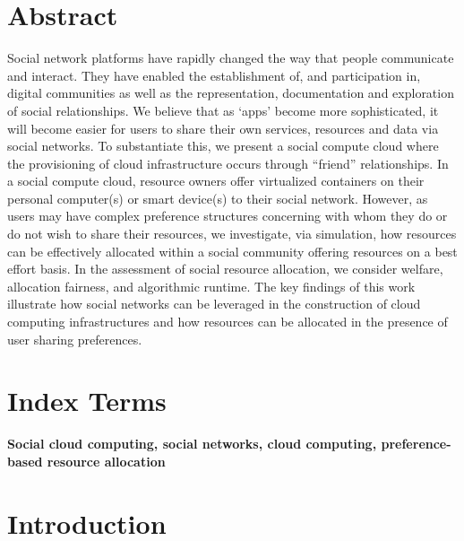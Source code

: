 \documentclass[a4paper,12pt]{article}
\begin{document}
    \newpage
    \tableofcontents
\newpage
    \listoffigures
    \newpage
    \section{Abstract}
	Social network platforms have rapidly changed the way that people communicate and interact. They have enabled the
	establishment of, and participation in, digital communities as well as the representation, documentation and exploration of social
	relationships. We believe that as ‘apps’ become more sophisticated, it will become easier for users to share their own services,
	resources and data via social networks. To substantiate this, we present a social compute cloud where the provisioning of cloud
	infrastructure occurs through “friend” relationships. In a social compute cloud, resource owners offer virtualized containers on their
	personal computer(s) or smart device(s) to their social network. However, as users may have complex preference structures
	concerning with whom they do or do not wish to share their resources, we investigate, via simulation, how resources can be effectively
	allocated within a social community offering resources on a best effort basis. In the assessment of social resource allocation, we
	consider welfare, allocation fairness, and algorithmic runtime. The key findings of this work illustrate how social networks can be
	leveraged in the construction of cloud computing infrastructures and how resources can be allocated in the presence of user sharing
	preferences.
    \section{Index Terms}
	\textbf{Social cloud computing, social networks, cloud computing, preference-based resource allocation}
    \section{Introduction}
\end{document}
